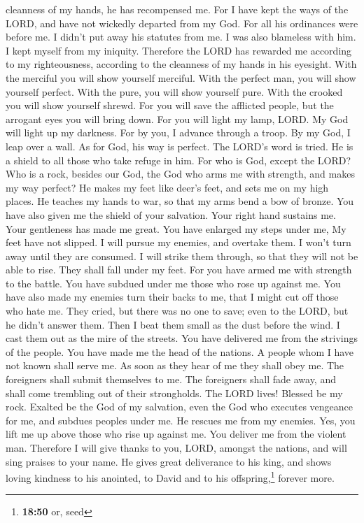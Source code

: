 cleanness of my hands, he has recompensed me.  For I have
kept the ways of the LORD, and have not wickedly departed from my God.
 For all his ordinances were before me. I didn't put away
his statutes from me.  I was also blameless with him. I
kept myself from my iniquity.  Therefore the LORD has
rewarded me according to my righteousness, according to the cleanness of
my hands in his eyesight.  With the merciful you will
show yourself merciful. With the perfect man, you will show yourself
perfect.  With the pure, you will show yourself pure.
With the crooked you will show yourself shrewd.  For you
will save the afflicted people, but the arrogant eyes you will bring
down.  For you will light my lamp, LORD. My God will
light up my darkness.  For by you, I advance through a
troop. By my God, I leap over a wall.  As for God, his
way is perfect. The LORD's word is tried. He is a shield to all those
who take refuge in him.  For who is God, except the LORD?
Who is a rock, besides our God,  the God who arms me with
strength, and makes my way perfect?  He makes my feet
like deer's feet, and sets me on my high places.  He
teaches my hands to war, so that my arms bend a bow of bronze.
 You have also given me the shield of your salvation.
Your right hand sustains me. Your gentleness has made me great.
 You have enlarged my steps under me, My feet have not
slipped.  I will pursue my enemies, and overtake them. I
won't turn away until they are consumed.  I will strike
them through, so that they will not be able to rise. They shall fall
under my feet.  For you have armed me with strength to
the battle. You have subdued under me those who rose up against me.
 You have also made my enemies turn their backs to me,
that I might cut off those who hate me.  They cried, but
there was no one to save; even to the LORD, but he didn't answer them.
 Then I beat them small as the dust before the wind. I
cast them out as the mire of the streets.  You have
delivered me from the strivings of the people. You have made me the head
of the nations. A people whom I have not known shall serve me.
 As soon as they hear of me they shall obey me. The
foreigners shall submit themselves to me.  The foreigners
shall fade away, and shall come trembling out of their strongholds.
 The LORD lives! Blessed be my rock. Exalted be the God
of my salvation,  even the God who executes vengeance for
me, and subdues peoples under me.  He rescues me from my
enemies. Yes, you lift me up above those who rise up against me. You
deliver me from the violent man.  Therefore I will give
thanks to you, LORD, amongst the nations, and will sing praises to your
name.  He gives great deliverance to his king, and shows
loving kindness to his anointed, to David and to his
offspring,\footnote{\textbf{18:50} or, seed} forever more.

